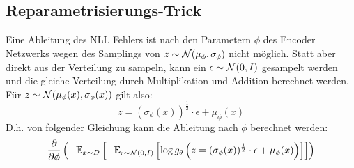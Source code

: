\subsection{Reparametrisierungs-Trick}\label{sec:reparam_trick}
Eine Ableitung des NLL Fehlers ist nach den Parametern $\phi$ des Encoder Netzwerks wegen des Samplings von $z \sim \mathcal{N}(\mu_\phi, \sigma_\phi)$ nicht möglich. Statt aber direkt aus der Verteilung zu sampeln, kann ein $\epsilon \sim \mathcal{N}(0, I)$ gesampelt werden und die gleiche Verteilung durch Multiplikation und Addition berechnet werden. Für $z \sim \mathcal{N}(\mu_\phi(x), \sigma_\phi(x))$ gilt also:
\begin{equation}
  z = (\sigma_\phi(x))^{\frac{1}{2}} \cdot \epsilon + \mu_\phi(x)
\end{equation}
D.h. von folgender Gleichung kann die Ableitung nach $\phi$ berechnet werden:
\begin{equation}
  \frac{\partial}{\partial \phi} \left(- \mathbb{E}_{x \sim D}\left[ -\mathbb{E}_{\epsilon \sim \mathcal{N}(0, I)}\left[ \log g_\theta\left(z = (\sigma_\phi(x))^{\frac{1}{2}} \cdot \epsilon + \mu_\phi(x)\right)\right] \right] \right)
\end{equation}
